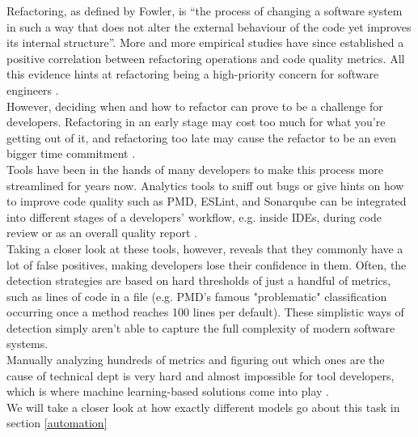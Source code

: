 Refactoring, as defined by Fowler\cite{fowler2018refactoring}, is “the process of changing a software system in such a way that does not alter the external behaviour of the code yet improves its internal structure”. More and more empirical studies have since established a positive correlation between refactoring operations and code quality metrics. All this evidence hints at refactoring being a high-priority concern for software engineers \cite{aniche2020effectiveness}.\\
However, deciding when and how to refactor can prove to be a challenge for developers. Refactoring in an early stage may cost too much for what you're getting out of it, and refactoring too late may cause the refactor to be an even bigger time commitment \cite{kruchten2012technical}.\\
Tools have been in the hands of many developers to make this process more streamlined for years now. Analytics tools to sniff out bugs or give hints on how to improve code quality such as PMD, ESLint, and Sonarqube can be integrated into different stages of a developers' workflow, e.g. inside IDEs, during code review or as an overall quality report \cite{aniche2020effectiveness}.\\
Taking a closer look at these tools, however, reveals that they commonly have a lot of false positives, making developers lose their confidence in them. Often, the detection strategies are based on hard thresholds of just a handful of metrics, such as lines of code in a file (e.g. PMD's famous "problematic" classification occurring once a method reaches 100 lines per default)\cite{aniche2020effectiveness}. These simplistic ways of detection simply aren't able to capture the full complexity of modern software systems.\\
Manually analyzing hundreds of metrics and figuring out which ones are the cause of technical dept is very hard and almost impossible for tool developers, which is where machine learning-based solutions come into play \cite{kataoka2002refactoring}\cite{leitch2003maintainability}.\\
We will take a closer look at how exactly different models go about this task in section \ref{automation}
